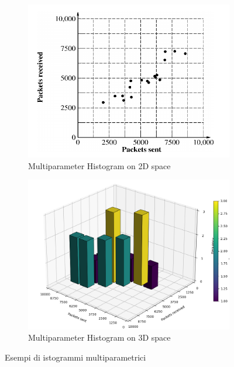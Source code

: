 \begin{figure}[h]
\centering

\begin{subfigure}[b]{0.8\textwidth}
\centering
\includegraphics[width=\textwidth]{img/chapter-3/multi-histogram.png}
\caption{Multiparameter Histogram on 2D space}\label{img:multi-histogram}
\end{subfigure}

\hfill

\begin{subfigure}[b]{0.8\textwidth}
\centering
\includegraphics[width=.8\textwidth]{img/chapter-3/multi-histogram-3d.png}
\caption{Multiparameter Histogram on 3D space}
\label{img:multi-histogram-3d}
\end{subfigure}

\caption{Esempi di istogrammi multiparametrici}\label{fig:multi-histograms}
\end{figure}

